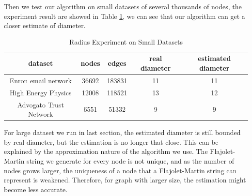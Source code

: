 Then we test our algorithm on small datasets of several thousands of nodes, the experiment result are showed in Table \ref{table:small}, we can see that our algorithm can get a closer estimate of diameter.

\begin{table}[!htbf]
\caption{Radius Experiment on Small Datasets}
\begin{center}
\begin{tabular}{|c|c|c|c|c|}
\hline \hline
dataset & nodes & edges & real diameter & estimated diameter \\
\hline
Enron email network & 36692 & 183831 & 11 & 11 \\
High Energy Physics & 12008 & 118521 & 13 & 12 \\
Advogato Trust Network & 6551 & 51332 & 9 & 9 \\
\hline
\end{tabular}
\end{center}
\label{table:small}
\end{table}%

For large dataset we run in last section, the estimated diameter is still bounded by real diameter, but the estimation is no longer that close. This can be explained by the approximation nature of the algorithm we use. The Flajolet-Martin string we generate for every node is not unique, and as the number of nodes grows larger, the uniqueness of a node that a Flajolet-Martin string can represent is weakened. Therefore, for graph with larger size, the estimation might become less accurate.






